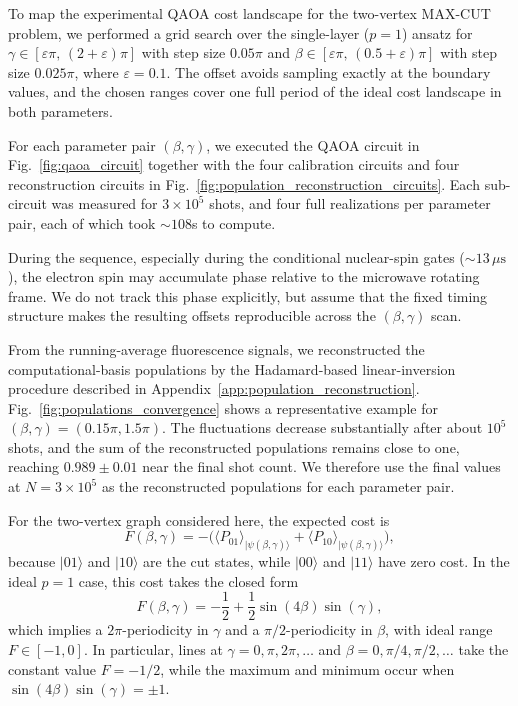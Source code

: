 \documentclass[conference]{IEEEtran}
\begin{document}
To map the experimental QAOA cost landscape for the two-vertex MAX-CUT problem,
we performed a grid search over the single-layer (\(p=1\)) ansatz for \( \gamma
\in [\varepsilon\pi,\,(2+\varepsilon)\pi] \) with step size \(0.05\pi\) and \(
\beta \in [\varepsilon\pi,\,(0.5+\varepsilon)\pi] \) with step size
\(0.025\pi\), where \(\varepsilon=0.1\). The offset avoids sampling exactly at
the boundary values, and the chosen ranges cover one full period of the ideal
cost landscape in both parameters.

For each parameter pair \((\beta,\gamma)\), we executed the QAOA circuit in
Fig.~\ref{fig:qaoa_circuit} together with the four calibration circuits and four
reconstruction circuits in Fig.~\ref{fig:population_reconstruction_circuits}.
Each sub-circuit was measured for \(3\times10^{5}\) shots, and four full
realizations per parameter pair, each of which took \(\sim108\)s to compute.

During the sequence, especially during the conditional nuclear-spin gates
(\(\sim 13\,\mu\mathrm{s}\)), the electron spin may accumulate phase relative to
the microwave rotating frame. We do not track this phase explicitly, but assume
that the fixed timing structure makes the resulting offsets reproducible across
the \((\beta,\gamma)\) scan.

From the running-average fluorescence signals, we reconstructed the
computational-basis populations by the Hadamard-based linear-inversion procedure
described in Appendix~\ref{app:population_reconstruction}.
Fig.~\ref{fig:populations_convergence} shows a representative example for
\((\beta,\gamma)=(0.15\pi,1.5\pi)\). The fluctuations decrease substantially
after about \(10^5\) shots, and the sum of the reconstructed populations remains
close to one, reaching \(0.989\pm0.01\) near the final shot count. We therefore
use the final values at \(N=3\times10^5\) as the reconstructed populations for
each parameter pair.

For the two-vertex graph considered here, the expected cost is
\begin{equation}
    F(\beta,\gamma)
    =
    -\bigl(
    \langle P_{01}\rangle_{|\psi(\beta,\gamma)\rangle}
    +
    \langle P_{10}\rangle_{|\psi(\beta,\gamma)\rangle}
    \bigr),
    \label{eq:experimental_cost_landscape}
\end{equation}
because \(|01\rangle\) and \(|10\rangle\) are the cut states, while
\(|00\rangle\) and \(|11\rangle\) have zero cost. In the ideal \(p=1\) case,
this cost takes the closed form
\begin{equation}
    F(\beta,\gamma)
    =
    -\frac{1}{2}
    + \frac{1}{2}\sin(4\beta)\sin(\gamma),
    \label{eq:closed_form_cost_landscape}
\end{equation}
which implies a \(2\pi\)-periodicity in \(\gamma\) and a \(\pi/2\)-periodicity
in \(\beta\), with ideal range \(F\in[-1,0]\). In particular, lines at
\(\gamma=0,\pi,2\pi,\dots\) and \(\beta=0,\pi/4,\pi/2,\dots\) take the constant
value \(F=-1/2\), while the maximum and minimum occur when
\(\sin(4\beta)\sin(\gamma)=\pm1\).
\end{document}
